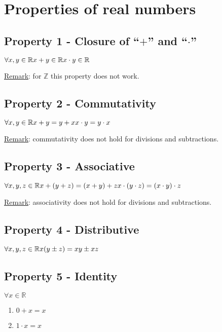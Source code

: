 \documentclass{article}
\begin{document}
\newpage
\section{Properties of real numbers}
\subsection{Property 1 - Closure of ``$+$'' and ``$\cdot$''}
$\forall x,y \in \mathbb{R}\\
x+y \in \mathbb{R}\\
x \cdot y \in \mathbb{R}$

\underline{Remark}: for $\mathbb{Z}$ this property does not work.

\subsection{Property 2 - Commutativity}
$\forall x,y \in \mathbb{R}\\
x+y=y+x\\
x \cdot y=y \cdot x$

\underline{Remark}: commutativity does not hold for divisions and
subtractions.

\subsection{Property 3 - Associative}
$\forall x,y,z \in \mathbb{R}\\
x+(y+z) = (x+y)+z\\
x \cdot (y\cdot z)=(x\cdot y)\cdot z$

\underline{Remark}: associativity does not hold for divisions and
subtractions.

\subsection{Property 4 - Distributive}
$\forall x,y,z \in \mathbb{R}\\
x(y \pm z)=xy \pm xz$

\subsection{Property 5 - Identity}
$\forall x \in \mathbb{R}$
\begin{enumerate}[label=\alph*)]
    \item $0+x=x$
    \item $1 \cdot x=x$
\end{enumerate}
\end{document}
